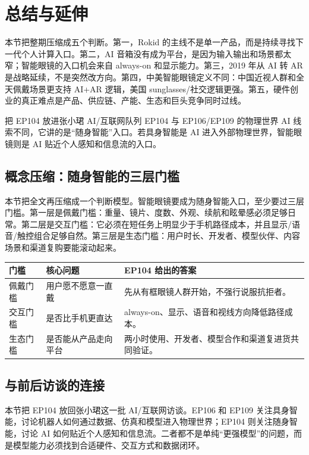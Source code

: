 \section{总结与延伸}

本节把整期压缩成五个判断。第一，Rokid 的主线不是单一产品，而是持续寻找下一代个人计算入口。第二，AI 音箱没有成为平台，是因为输入输出和场景都太窄；智能眼镜的入口机会来自 always-on 和显示能力。第三，2019 年从 AI 转 AR 是战略延续，不是突然改方向。第四，中美智能眼镜定义不同：中国近视人群和全天佩戴场景更支持 AI+AR 逻辑，美国 sunglasses/社交逻辑更强。第五，硬件创业的真正难点是产品、供应链、产能、生态和巨头竞争同时过线。

\begin{importantbox}{把 EP104 放进张小珺 AI/互联网队列}
EP104 与 EP106/EP109 的物理世界 AI 线索不同，它讲的是“随身智能”入口。若具身智能是 AI 进入外部物理世界，智能眼镜则是 AI 贴近个人感知和信息流的入口。
\end{importantbox}

\subsection{概念压缩：随身智能的三层门槛}

本节把全文再压缩成一个判断模型。智能眼镜要成为随身智能入口，至少要过三层门槛。第一层是佩戴门槛：重量、镜片、度数、外观、续航和眩晕感必须足够日常。第二层是交互门槛：它必须在短任务上明显少于手机路径成本，并且显示/语音/触控组合足够自然。第三层是生态门槛：用户时长、开发者、模型伙伴、内容场景和渠道复购要能滚动起来。

\noindent\begin{tabularx}{\textwidth}{p{}p{}X}
\toprule
门槛 & 核心问题 & EP104 给出的答案 \\
\midrule
佩戴门槛 & 用户愿不愿意一直戴 & 先从有框眼镜人群开始，不强行说服抗拒者。 \\
交互门槛 & 是否比手机更直达 & always-on、显示、语音和视线方向降低路径成本。 \\
生态门槛 & 是否能从产品走向平台 & 两小时使用、开发者、模型合作和渠道复进货共同验证。 \\
\bottomrule
\end{tabularx}

\subsection{与前后访谈的连接}

本节把 EP104 放回张小珺这一批 AI/互联网访谈。EP106 和 EP109 关注具身智能，讨论机器人如何通过数据、仿真和模型进入物理世界；EP104 则关注随身智能，讨论 AI 如何贴近个人感知和信息流。二者都不是单纯“更强模型”的问题，而是模型能力必须找到合适硬件、交互方式和数据闭环。


